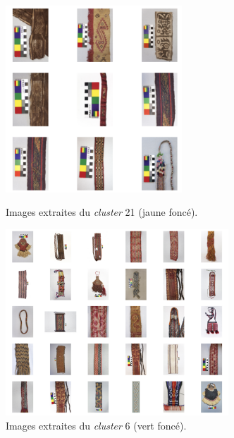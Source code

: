 \begin{figure}[!h]
\begin{minipage}[c]{.5\linewidth}
      \begin{center}
       		\includegraphics[height=7cm]{../images/YOLO_NS_KMEAN_21.png}
		 \caption{Images extraites du \textit{cluster} 21 (jaune foncé).}
		 \label{fig:c21}
	\end{center}
    \end{minipage}
    \hspace{5pt}
    \begin{minipage}[c]{.5\linewidth}
        \begin{center}
        		\includegraphics[height=7cm]{../images/YOLO_NS_KMEAN_6.png}
		 \caption{Images extraites du \textit{cluster} 6 (vert foncé).}
		 \label{fig:c6}
	\end{center}
    \end{minipage}
\end{figure}

